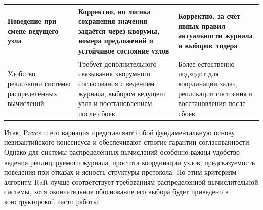 \begin{longtable}{|p{}|p{}|p{}|}
    Поведение при смене ведущего узла &
    Корректно, но логика сохранения значения задаётся через кворумы, номера предложений и устойчивое состояние узлов &
    Корректно, за счёт явных правил актуальности журнала и выборов лидера \\ \hline

    Удобство реализации системы распределённых вычислений &
    Требует дополнительного связывания кворумного согласования с ведением журнала, выбором ведущего узла и восстановлением после сбоев &
    Более естественно подходит для координации задач, репликации состояния и восстановления после сбоев \\ \hline

\end{longtable}

Итак, Paxos и его вариация представляют собой фундаментальную
основу невизантийского консенсуса и обеспечивают строгие гарантии
согласованности. Однако для системы распределённых вычислений особенно важны
удобство ведения реплицируемого журнала, простота координации узлов,
предсказуемость поведения при отказах и ясность структуры протокола. По этим
критериям алгоритм Raft лучше соответствует требованиям распределённой
вычислительной системы, хотя окончательное обоснование его выбора будет
приведено в конструкторской части работы.
